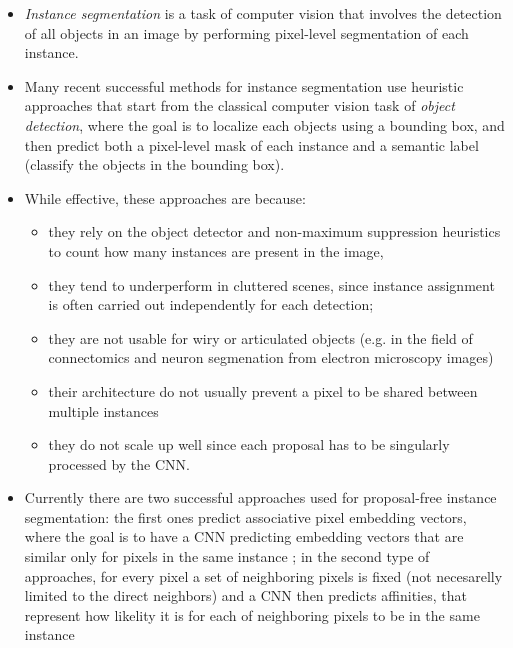 \begin{itemize}
\item \emph{Instance segmentation} is a task of computer vision that involves the detection of all objects in an image by performing pixel-level segmentation of each instance.   
\item Many recent successful methods for instance segmentation %
 use heuristic approaches that start from the classical computer vision task of \emph{object detection}, where the goal is to localize each objects using a bounding box, and then predict both a pixel-level mask of each instance and a semantic label (classify the objects in the bounding box).  \cite{yang2012layered,ladicky2010and,hariharan2014simultaneous,chen2015multi,dai2016instance,liang2016reversible,he2017mask}
\item While effective, these approaches are  because:
\begin{itemize}
\item they rely on the object detector and non-maximum suppression heuristics to count how many instances are present in the image, 
\item they tend to underperform in cluttered scenes, since instance assignment is often carried out independently for each detection; 
\item they are not usable for wiry or articulated objects (e.g. in the field of connectomics and neuron segmenation from electron microscopy images) 
\item their architecture do not usually prevent a pixel to be shared between multiple instances
\item they do not scale up well since each proposal has to be singularly processed by the CNN. 
\end{itemize}

\item Currently there are two successful approaches used for proposal-free instance segmentation: the first ones predict associative pixel embedding vectors, where the goal is to have a CNN predicting embedding vectors that are similar only for pixels in the same instance \cite{kong2018recurrent,fathi2017semantic,newell2017associative,de2017semantic}; in the second type of approaches, for every pixel a set of neighboring pixels is fixed  (not necesarelly limited to the direct neighbors) and a CNN then predicts affinities, that represent how likelity it is for each of neighboring pixels to be in the same instance \cite{liu2018affinity,wolf2018mutex,xie2015holistically}


\end{itemize}
